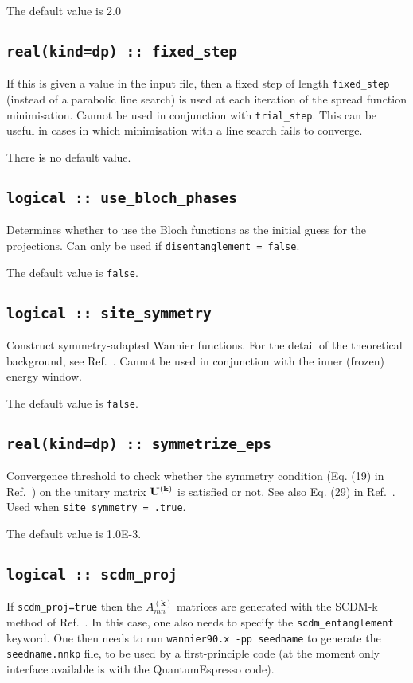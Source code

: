 The default value is 2.0

\subsection[fixed\_step]{\tt real(kind=dp) :: fixed\_step}
If this is given a value in the input file, then a fixed step of length
\verb#fixed_step# (instead of a parabolic
line search) is used at each iteration of the spread function
minimisation. Cannot be used in conjunction with
\verb#trial_step#. This can be useful in cases in which minimisation
with a line search fails to converge.

There is no default value.

\subsection[use\_bloch\_phases]{\tt logical :: use\_bloch\_phases}

Determines whether to use the Bloch functions as the
initial guess for the projections. Can only be used if
\verb#disentanglement = false#.

The default value is \verb#false#.


\subsection[site\_symmetry]{\tt logical :: site\_symmetry}

Construct symmetry-adapted Wannier functions.
For the detail of the theoretical background, see Ref.~\cite{sakuma-prb13}.
Cannot be used in conjunction with the inner (frozen) energy window.

The default value is \verb#false#.

\subsection[symmetrize\_eps]{\tt real(kind=dp) :: symmetrize\_eps}

Convergence threshold to check whether the symmetry condition (Eq. (19) in Ref.~\cite{sakuma-prb13})
on the unitary matrix $\mathbf{U}^{(\mathbf{k})}$ is satisfied or not.
See also Eq. (29) in Ref.~\cite{sakuma-prb13}.
Used when \verb#site_symmetry = .true#.

The default value is 1.0E-3.

\subsection[scdm\_proj]{\tt logical :: scdm\_proj}
If {\tt scdm\_proj=true} then the $A_{mn}^{(\mathbf{k})}$ matrices are generated with the SCDM-k method of Ref.~\cite{LinLin-ArXiv2017}. In this case, one also needs to specify the {\tt scdm\_entanglement} keyword. One then needs to run {\tt wannier90.x -pp seedname} to generate the {\tt seedname.nnkp} file, to be used by a first-principle code (at the moment only interface available is with the QuantumEspresso code).

